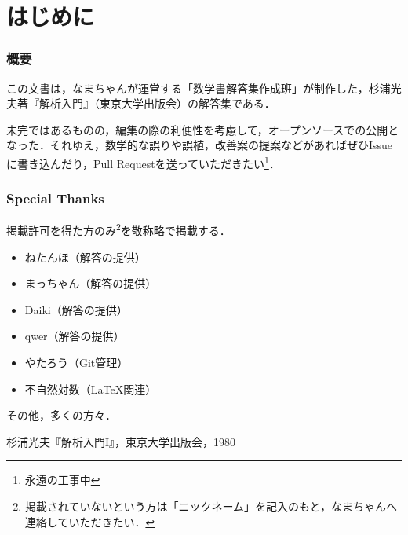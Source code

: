 \documentclass[a4paper,10pt,fleqn]{ltjsarticle}
\begin{document}


\thispagestyle{empty}

\newpage
{}
\pagecolor{white}

\begin{multicols}{3}
    \tableofcontents
\end{multicols}

\newpage

\part*{はじめに}


\section*{概要}

この文書は，なまちゃんが運営する「数学書解答集作成班」が制作した，杉浦光夫著『解析入門』（東京大学出版会）の解答集である．

未完ではあるものの，編集の際の利便性を考慮して，オープンソースでの公開となった．それゆえ，数学的な誤りや誤植，改善案の提案などがあればぜひIssueに書き込んだり，Pull Requestを送っていただきたい\footnote{永遠の工事中}．


\section*{Special Thanks}

掲載許可を得た方のみ\footnote{掲載されていないという方は「ニックネーム」を記入のもと，なまちゃんへ連絡していただきたい．}を敬称略で掲載する．
\begin{itemize}
    \item ねたんほ（解答の提供）
    \item まっちゃん（解答の提供）
    \item Daiki（解答の提供）
    \item qwer（解答の提供）
    \item やたろう（Git管理）
    \item 不自然対数（\LaTeX 関連）
\end{itemize}

その他，多くの方々．

\newpage

\newpage

\newpage

\newpage

\newpage

\newpage

\begin{thebibliography}{9}
     杉浦光夫『解析入門I』，東京大学出版会，1980
\end{thebibliography}
\end{document}
